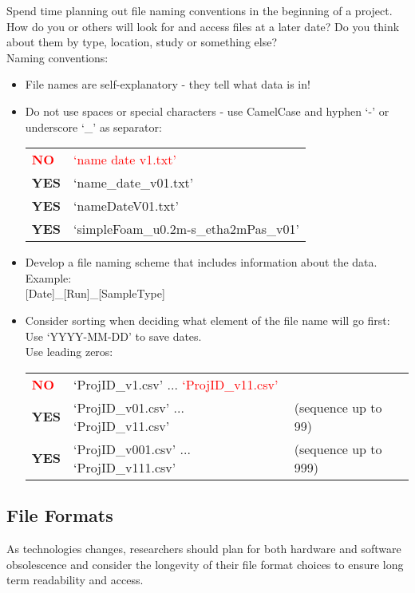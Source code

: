 Spend time planning out file naming conventions in the beginning of a project.
How do you or others will look for and access files at a later date? Do you
think about them by type, location, study or something else? \\[8pt]
Naming conventions:
\begin{itemize}
  \item File names are self-explanatory - they tell what data is in!
  \item Do not use spaces or special characters - use CamelCase and hyphen
        ‘-’ or underscore ‘\_’ as separator: \\
        \begin{tabular}{ll}
          \textcolor{red}{\textbf{NO}}  & \textcolor{red}{‘name date v1.txt’} \\
          \textbf{YES} & ‘name\_date\_v01.txt’ \\
          \textbf{YES} & ‘nameDateV01.txt’ \\
          \textbf{YES} & ‘simpleFoam\_u0.2m-s\_etha2mPas\_v01’ \\
        \end{tabular}
  \item Develop a file naming scheme that includes information about the data.
        Example: \\
        {[Date]}\_{[Run]}\_{[SampleType]}
  \item Consider sorting when deciding what element of the file name will
        go first: \\
        Use ‘YYYY-MM-DD’ to save dates. \\
        Use leading zeros: \\
        \begin{tabular}{lll}
          \textcolor{red}{\textbf{NO}}  & ‘ProjID\_v1.csv’  	...  	\textcolor{red}{‘ProjID\_v11.csv’} & \\
          \textbf{YES} & ‘ProjID\_v01.csv’ 	... 	‘ProjID\_v11.csv’
             & (sequence up to 99) \\
          \textbf{YES} & ‘ProjID\_v001.csv’ 	...	‘ProjID\_v111.csv’
             & (sequence up to 999) \\
        \end{tabular}
\end{itemize}

\subsection{File Formats}
As technologies changes, researchers should plan for both hardware and software
obsolescence and consider the longevity of their file format choices to ensure
long term readability and access.



